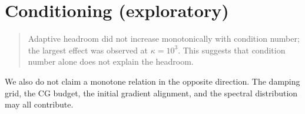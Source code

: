 \section{Conditioning (exploratory)}
\label{sec:conditioning}

\begin{table}[!ht]
  \centering
  
  \caption{ by spec, $n = 10$ each. Exploratory: the specs were not
  designed as a factorial study of the condition number.}
  \label{tab:conditioning}
\end{table}

\begin{quote}
Adaptive headroom did not increase monotonically with condition number; the largest
effect was observed at $\kappa = 10^3$. This suggests that condition number alone
does not explain the headroom.
\end{quote}

We also do not claim a monotone relation in the opposite direction. The damping
grid, the CG budget, the initial gradient alignment, and the spectral distribution
may all contribute.
